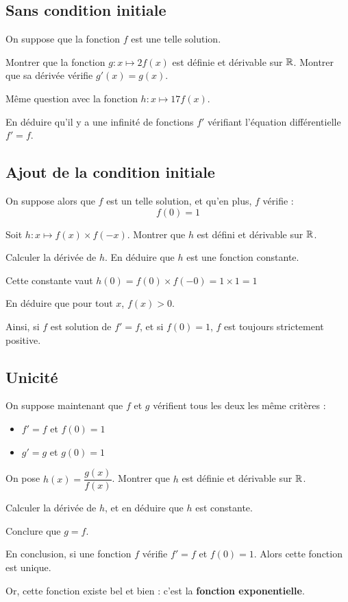 \documentclass{exos}
\begin{document}
\subsection{Sans condition initiale}
On suppose que la fonction $f$ est une telle solution.
\begin{alphaquestions}
\item Montrer que la fonction $g : x \mapsto 2f(x)$ est définie et dérivable sur $\mathbb{R}$. Montrer que sa dérivée vérifie $g'(x) = g(x)$.
\item Même question avec la fonction $h : x \mapsto 17f(x)$.
\item En déduire qu'il y a une infinité de fonctions $f'$ vérifiant l'équation différentielle $f' = f$.

\subsection{Ajout de la condition initiale}
On suppose alors que $f$ est un telle solution, et qu'en plus, $f$ vérifie :
\begin{equation*}
f(0) = 1
\end{equation*}
\item Soit $h : x \mapsto f(x) \times f(-x)$. Montrer que $h$ est défini et dérivable sur $\mathbb{R}$.
\item Calculer la dérivée de $h$. En déduire que $h$ est une fonction constante.

Cette constante vaut $h(0) = f(0) \times f(- 0) = 1 \times 1 = 1$

\item En déduire que pour tout $x$, $f(x) > 0$.

Ainsi, si $f$ est solution de $f' = f$, et si $f(0) = 1$, $f$ est toujours strictement positive.

\subsection{Unicité}
On suppose maintenant que $f$ et $g$ vérifient tous les deux les même critères :
\begin{itemize}
\item $f' = f$ et $f(0) = 1$
\item $g' = g$ et $g(0) = 1$
\end{itemize}
\item On pose $h(x) = \dfrac{g(x)}{f(x)}$. Montrer que $h$ est définie et dérivable sur $\mathbb{R}$.
\item Calculer la dérivée de $h$, et en déduire que $h$ est constante.
\item Conclure que $g = f$.
\end{alphaquestions}
En conclusion, si une fonction $f$ vérifie $f' = f$ et $f(0) = 1$. Alors cette fonction est unique.

Or, cette fonction existe bel et bien : c'est la \textbf{fonction exponentielle}.
\end{document}
